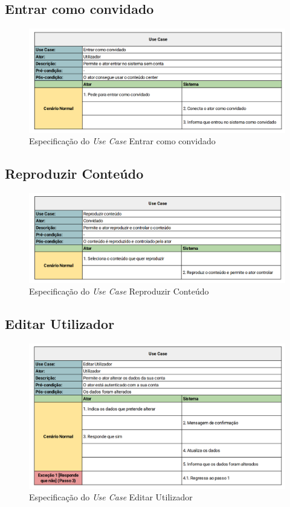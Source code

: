 \documentclass[a4paper]{report}
\begin{document}
\subsection{Entrar como convidado}
\begin{figure}[H]
	\centering 
    \includegraphics[width=\textwidth]{images/Entrar_como_convidado.png}  
    \caption{Especificação do \emph{Use Case} Entrar como convidado}
\end{figure}

\subsection{Reproduzir Conteúdo}
\begin{figure}[H]
	\centering 
    \includegraphics[width=\textwidth]{images/Media_Control.png}  
    \caption{Especificação do \emph{Use Case} Reproduzir Conteúdo}
\end{figure}

\subsection{Editar Utilizador}
\begin{figure}[H]
	\centering 
    \includegraphics[width=\textwidth]{images/Definir_Password.png}  
    \caption{Especificação do \emph{Use Case} Editar Utilizador}
\end{figure}
\end{document}
